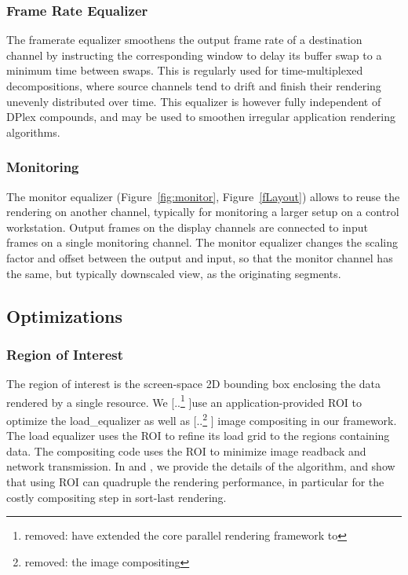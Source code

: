 \documentclass[10pt,journal,compsoc]{IEEEtran}
\newcommand{\fig}[1]{Figure~\ref{#1}}
\providecommand{\DIFaddtex}[1]{{\protect\color{blue} \sf #1}} %
\providecommand{\DIFdeltex}[1]{{\protect\color{red} [..\footnote{removed: #1} ]}} %
\providecommand{\DIFaddbegin}{} %
\providecommand{\DIFaddend}{} %
\providecommand{\DIFdelbegin}{} %
\providecommand{\DIFdelend}{} %
\providecommand{\DIFadd}[1]{\texorpdfstring{\DIFaddtex{#1}}{#1}} %
\providecommand{\DIFdel}[1]{\texorpdfstring{\DIFdeltex{#1}}{}} %
\newcommand{\DIFscaledelfig}{0.5}
\newlength{\DIFdelgraphicswidth} %
\newlength{\DIFdelgraphicsheight} %
\newcommand{\DIFaddincludegraphics}[2][]{{\color{blue}\fbox{\DIFOincludegraphics[#1]{#2}}}} %
\newcommand{\DIFdelincludegraphics}[2][]{%
\sbox{\DIFdelgraphicsbox}{\DIFOincludegraphics[#1]{#2}}%
\settoboxwidth{\DIFdelgraphicswidth}{\DIFdelgraphicsbox} %
\settoboxtotalheight{\DIFdelgraphicsheight}{\DIFdelgraphicsbox} %
\scalebox{\DIFscaledelfig}{%
\parbox[b]{\DIFdelgraphicswidth}{\usebox{\DIFdelgraphicsbox}\\[-\baselineskip] \rule{\DIFdelgraphicswidth}{0em}}\llap{\resizebox{\DIFdelgraphicswidth}{\DIFdelgraphicsheight}{%
\setlength{\unitlength}{\DIFdelgraphicswidth}%
\begin{picture}(1,1)%
\thicklines\linethickness{2pt} %
{\color[rgb]{1,0,0}\put(0,0){\framebox(1,1){}}}%
{\color[rgb]{1,0,0}\put(0,0){\line( 1,1){1}}}%
{\color[rgb]{1,0,0}\put(0,1){\line(1,-1){1}}}%
\end{picture}%
}\hspace*{3pt}}} %
} %
\DeclareRobustCommand{\DIFaddbegin}{\DIFOaddbegin \let\includegraphics\DIFaddincludegraphics} %
\DeclareRobustCommand{\DIFaddend}{\DIFOaddend \let\includegraphics\DIFOincludegraphics} %
\DeclareRobustCommand{\DIFdelbegin}{\DIFOdelbegin \let\includegraphics\DIFdelincludegraphics} %
\DeclareRobustCommand{\DIFdelend}{\DIFOaddend \let\includegraphics\DIFOincludegraphics} %
\begin{document}
\subsubsection{Frame Rate Equalizer}\label{sec:framerateEq}

The framerate equalizer smoothens the output frame rate of a destination channel
by instructing the corresponding window to delay its buffer swap to a minimum
time between swaps. This is regularly used for time-multiplexed decompositions,
where source channels tend to drift and finish their rendering unevenly
distributed over time. This equalizer is however fully independent of DPlex
compounds, and may be used to smoothen irregular application rendering
algorithms.

\subsubsection{Monitoring}

The monitor equalizer (\fig{fig:monitor}, \fig{fLayout}) allows to reuse the
rendering on another channel, typically for monitoring a larger setup on a
control workstation. Output frames on the display channels are connected to
input frames on a single monitoring channel. The monitor equalizer changes the
scaling factor and offset between the output and input, so that the monitor
channel has the same, but typically downscaled view, as the originating
segments.

\subsection{Optimizations}

\subsubsection{Region of Interest}

The region of interest is the screen-space 2D bounding box enclosing the data
rendered by a single resource. We \DIFdelbegin \DIFdel{have extended the core parallel rendering
framework to }\DIFdelend use an application-provided ROI to optimize
the \textsf{load\_equalizer} as well as \DIFdelbegin \DIFdel{the image compositing }\DIFdelend \DIFaddbegin \DIFadd{image compositing in our framework}\DIFaddend . The
load equalizer uses the ROI to refine its load grid to the regions containing
data. The compositing code uses the ROI to minimize image readback and network
transmission. In \cite{MEP:10} and \cite{EBAHMP:12}, we provide the details of
the algorithm, and show that using ROI can quadruple the rendering performance,
in particular for the costly compositing step in sort-last rendering.
\end{document}

